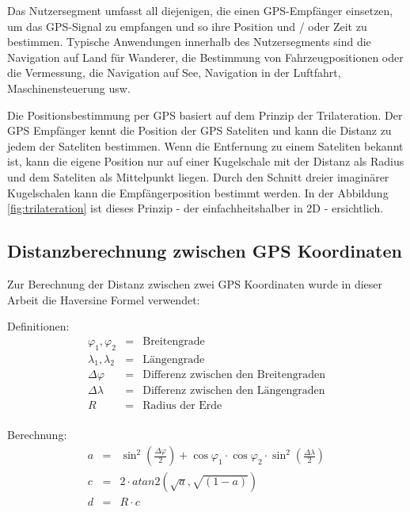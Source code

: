 Das Nutzersegment umfasst all diejenigen, die einen GPS-Empfänger einsetzen, um das GPS-Signal zu empfangen und so ihre Position und / oder Zeit zu bestimmen. Typische Anwendungen innerhalb des Nutzersegments sind die Navigation auf Land für Wanderer, die Bestimmung von Fahrzeugpositionen oder die Vermessung, die Navigation auf See, Navigation in der Luftfahrt, Maschinensteuerung usw. \cite{leicagps}

Die Positionsbestimmung per GPS basiert auf dem Prinzip der Trilateration. Der GPS Empfänger kennt die Position der GPS Sateliten und kann die Distanz zu jedem der Sateliten bestimmen. Wenn die Entfernung zu einem Sateliten bekannt ist, kann die eigene Position nur auf einer Kugelschale mit der Distanz als Radius und dem Sateliten als Mittelpunkt liegen. Durch den Schnitt dreier imaginärer Kugelschalen kann die Empfängerposition bestimmt werden. In der Abbildung \ref{fig:trilateration} ist dieses Prinzip - der einfachheitshalber in 2D - ersichtlich. \cite{leicagps}

\subsection{Distanzberechnung zwischen GPS Koordinaten}
\label{subsec:basicscalcdistance}
Zur Berechnung der Distanz zwischen zwei GPS Koordinaten wurde in dieser Arbeit die Haversine Formel verwendet: \cite{haversine} 

Definitionen:\\
\begin{equation}
\begin{array}{lcl}
\varphi_1, \varphi_2 & = & \text{Breitengrade}\\
\lambda_1, \lambda_2 & = & \text{Längengrade}\\
\Delta\varphi & = & \text{Differenz zwischen den Breitengraden}\\
\Delta\lambda & = & \text{Differenz zwischen den Längengraden}\\
R & = & \text{Radius der Erde}\\
\end{array}
\end{equation}

Berechnung:\\
\begin{equation}
\begin{array}{lcl}
a & = &\sin^2(\frac{\Delta\varphi}{2})+\cos \varphi_1 \cdot \cos \varphi_2 \cdot \sin^2(\frac{\Delta\lambda}{2})\\
c & = & 2 \cdot atan2(\sqrt{a}, \sqrt{(1-a)})\\
d & = & R \cdot c
\end{array}
\end{equation}

